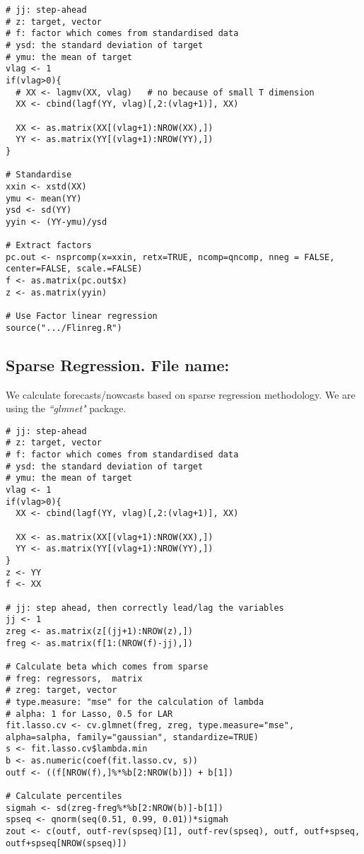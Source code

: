 \documentclass[12pt]{article}
\begin{document}
\begin{lstlisting}[title=\textbf{Sparse Principal Components.}]
# jj: step-ahead
# z: target, vector
# f: factor which comes from standardised data
# ysd: the standard deviation of target
# ymu: the mean of target
vlag <- 1
if(vlag>0){
  # XX <- lagmv(XX, vlag)   # no because of small T dimension
  XX <- cbind(lagf(YY, vlag)[,2:(vlag+1)], XX)

  XX <- as.matrix(XX[(vlag+1):NROW(XX),])
  YY <- as.matrix(YY[(vlag+1):NROW(YY),])
}

# Standardise
xxin <- xstd(XX)
ymu <- mean(YY)
ysd <- sd(YY)
yyin <- (YY-ymu)/ysd

# Extract factors
pc.out <- nsprcomp(x=xxin, retx=TRUE, ncomp=qncomp, nneg = FALSE, center=FALSE, scale.=FALSE)
f <- as.matrix(pc.out$x)
z <- as.matrix(yyin)

# Use Factor linear regression
source(".../Flinreg.R")
\end{lstlisting}

\subsection{Sparse Regression. File name: \color{blue}{sparse.R}}

We calculate forecasts/nowcasts based on sparse regression methodology. We are
using the \emph{``glmnet"} package.

\begin{lstlisting}[title=\textbf{Sparse Regression.}]
# jj: step-ahead
# z: target, vector
# f: factor which comes from standardised data
# ysd: the standard deviation of target
# ymu: the mean of target
vlag <- 1
if(vlag>0){
  XX <- cbind(lagf(YY, vlag)[,2:(vlag+1)], XX)

  XX <- as.matrix(XX[(vlag+1):NROW(XX),])
  YY <- as.matrix(YY[(vlag+1):NROW(YY),])
}
z <- YY
f <- XX

# jj: step ahead, then correctly lead/lag the variables
jj <- 1
zreg <- as.matrix(z[(jj+1):NROW(z),])
freg <- as.matrix(f[1:(NROW(f)-jj),])

# Calculate beta which comes from sparse
# freg: regressors,  matrix
# zreg: target, vector
# type.measure: "mse" for the calculation of lambda
# alpha: 1 for Lasso, 0.5 for LAR
fit.lasso.cv <- cv.glmnet(freg, zreg, type.measure="mse", alpha=salpha, family="gaussian", standardize=TRUE)
s <- fit.lasso.cv$lambda.min
b <- as.numeric(coef(fit.lasso.cv, s))
outf <- ((f[NROW(f),]%*%b[2:NROW(b)]) + b[1])

# Calculate percentiles
sigmah <- sd(zreg-freg%*%b[2:NROW(b)]-b[1])
spseq <- qnorm(seq(0.51, 0.99, 0.01))*sigmah
zout <- c(outf, outf-rev(spseq)[1], outf-rev(spseq), outf, outf+spseq, outf+spseq[NROW(spseq)])
\end{lstlisting}
\end{document}
